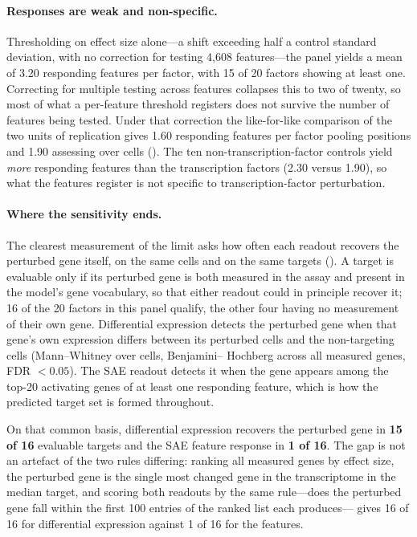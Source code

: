 \documentclass[onecolumn,11pt]{article}
\begin{document}
\paragraph{Responses are weak and non-specific.} Thresholding on effect size alone---a shift
exceeding half a control standard deviation, with no correction for testing 4,608 features---the
panel yields a mean of 3.20 responding features per factor, with 15 of 20 factors showing at least
one. Correcting for multiple testing across features collapses this to two of twenty, so most of
what a per-feature threshold registers does not survive the number of features being tested. Under
that correction the like-for-like comparison of the two units of replication gives 1.60 responding
features per factor pooling positions and 1.90 assessing over cells (). The ten non-transcription-factor controls yield
\emph{more} responding features than the transcription factors (2.30 versus 1.90), so what the
features register is not specific to transcription-factor perturbation.

\paragraph{Where the sensitivity ends.} The clearest measurement of the limit asks how often each
readout recovers the perturbed gene itself, on the same cells and on the same targets
(). A target is evaluable only if its perturbed gene is both measured in the
assay and present in the model's gene vocabulary, so that either readout could in principle recover
it; 16 of the 20 factors in this panel qualify, the other four having no measurement of their own
gene. Differential expression detects the perturbed gene when that gene's own expression differs
between its perturbed cells and the non-targeting cells (Mann--Whitney over cells, Benjamini--
Hochberg across all measured genes, FDR $< 0.05$). The SAE readout detects it when the gene appears
among the top-20 activating genes of at least one responding feature, which is how the predicted
target set is formed throughout.

On that common basis, differential expression recovers the perturbed gene in \textbf{15 of 16}
evaluable targets and the SAE feature response in \textbf{1 of 16}. The gap is not an artefact of
the two rules differing: ranking all measured genes by effect size, the perturbed gene is the single
most changed gene in the transcriptome in the median target, and scoring both readouts by the same
rule---does the perturbed gene fall within the first 100 entries of the ranked list each produces---
gives 16 of 16 for differential expression against 1 of 16 for the features.
\end{document}
